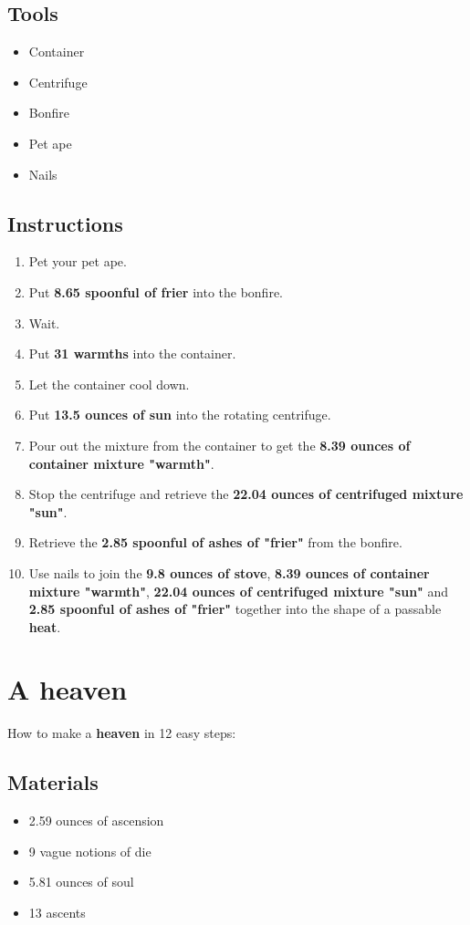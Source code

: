 \documentclass{article}
\begin{document}
\subsection{Tools}\begin{itemize}
\item 
Container
\item 
Centrifuge
\item 
Bonfire
\item 
Pet ape
\item 
Nails
\end{itemize}
\subsection{Instructions}\begin{enumerate}
\item 
Pet your pet ape.
\item 
Put \textbf{8.65 spoonful of frier} into the bonfire.
\item 
Wait.
\item 
Put \textbf{31 warmths} into the container.
\item 
Let the container cool down.
\item 
Put \textbf{13.5 ounces of sun} into the rotating centrifuge.
\item 
Pour out the mixture from the container to get the \textbf{8.39 ounces of container mixture "warmth"}.
\item 
Stop the centrifuge and retrieve the \textbf{22.04 ounces of centrifuged mixture "sun"}.
\item 
Retrieve the \textbf{2.85 spoonful of ashes of "frier"} from the bonfire.
\item 
Use nails to join the \textbf{9.8 ounces of stove}, \textbf{8.39 ounces of container mixture "warmth"}, \textbf{22.04 ounces of centrifuged mixture "sun"} and \textbf{2.85 spoonful of ashes of "frier"} together into the shape of a passable \textbf{heat}.
\end{enumerate}
\newpage
\section{A heaven}How to make a \textbf{heaven} in 12 easy steps:

\subsection{Materials}\begin{itemize}
\item 
2.59 ounces of ascension
\item 
9 vague notions of die
\item 
5.81 ounces of soul
\item 
13 ascents
\end{itemize}
\end{document}
